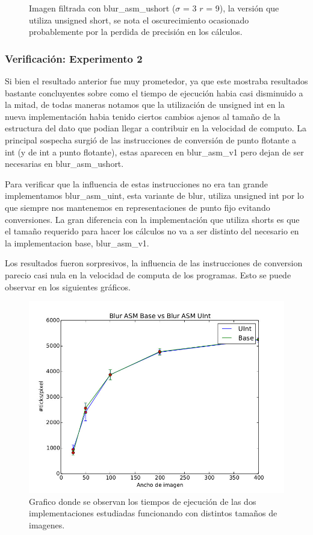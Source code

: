 \begin{figure}[H]
\begin{minipage}{0.48\textwidth}
  \caption{\footnotesize{Imagen filtrada con blur\_asm\_ushort ($\sigma$ = 3 $r$ = 9), la versión que utiliza unsigned short, se nota el oscurecimiento ocasionado probablemente por la perdida de precisión en los cálculos.}}
  \label{fig:tiempo2}
\end{minipage}
\end{figure}


\subsubsection{Verificación: Experimento 2}

Si bien el resultado anterior fue muy prometedor, ya que este mostraba
resultados bastante concluyentes sobre como el tiempo de ejecución habia casi
disminuido a la mitad, de todas maneras notamos que la utilización de unsigned
int en la nueva implementación habia tenido ciertos cambios ajenos al tamaño de
la estructura del dato que podian llegar a contribuir en la velocidad de
computo. La principal sospecha surgió de las instrucciones de conversión de
punto flotante a int (y de int a punto flotante), estas aparecen en
blur\_asm\_v1 pero dejan de ser necesarias en blur\_asm\_ushort.

Para verificar que la influencia de estas instrucciones no era tan grande
implementamos blur\_asm\_uint, esta variante de blur, utiliza unsigned int por
lo que siempre nos mantenemos en representaciones de punto fijo evitando
conversiones. La gran diferencia con la implementación que utiliza shorts es que
el tamaño requerido para hacer los cálculos no va a ser distinto del necesario
en la implementacion base, blur\_asm\_v1.

Los resultados fueron sorpresivos, la influencia de las instrucciones de
conversion parecio casi nula en la velocidad de computa de los programas. Esto
se puede observar en los siguientes gráficos.

\begin{figure}[H]
\centering
    \includegraphics[scale=0.5]{imgs/blur_uint.jpg}
  \caption{\footnotesize{Grafico donde se observan los tiempos de ejecución de las dos implementaciones estudiadas funcionando con distintos tamaños de imagenes.}}
  \label{fig:tiempo1}
\end{figure}

